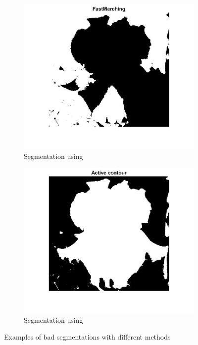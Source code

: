 \documentclass[11]{article}
\begin{document}
\begin{figure}[H]
    \begin{subfigure}[t]{0.45\textwidth}
    \centering
  \includegraphics[scale=0.20]{images/segmentation2.jpg}
    \caption{Segmentation using }
    \label{Segmentation using }
    \end{subfigure}
    \begin{subfigure}[t]{0.45\textwidth}
    \centering
    \includegraphics[scale=0.20]{images/segmentation3.jpg}
    \caption{Segmentation using }
    \label{segmentation3}
    \end{subfigure}
    \label{segmentationALL}
    \caption{Examples of bad segmentations with different methods}
\end{figure}
\end{document}
